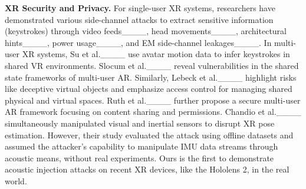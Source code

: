 \textbf{XR Security and Privacy.} 
For single-user XR systems, researchers have demonstrated various side-channel attacks to extract sensitive information (\eg keystrokes) through video feeds____, head movements____, architectural hints____, power usage____, and EM side-channel leakages____. In multi-user XR systems, Su et al.____ use avatar motion data to infer keystrokes in shared VR environments. Slocum et al.____ reveal vulnerabilities in the shared state frameworks of multi-user AR. Similarly, Lebeck et al.____ highlight risks like deceptive virtual objects and emphasize access control for managing shared physical and virtual spaces. Ruth et al.____ further propose a secure multi-user AR framework focusing on content sharing and permissions.
Chandio et al.____ %
simultaneously manipulated visual and inertial sensors to disrupt XR pose estimation. However, their study evaluated the attack using offline datasets and assumed the attacker's capability to manipulate IMU data streams through acoustic means, without real experiments. Ours is the first to demonstrate acoustic injection attacks on recent XR devices, like the Hololens 2, in the real world.